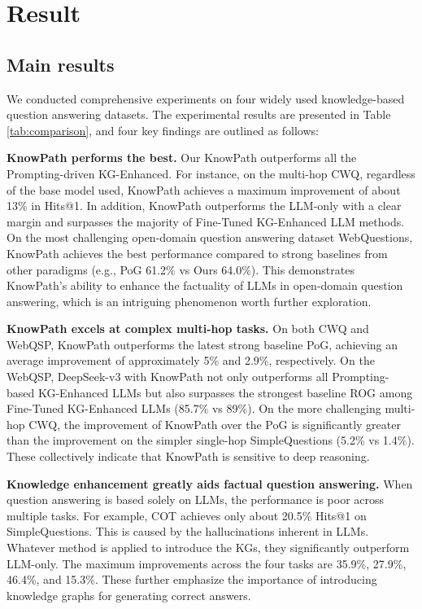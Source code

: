 \section{Result}

\subsection{Main results}

We conducted comprehensive experiments on four widely used knowledge-based question answering datasets. The experimental results are presented in Table \ref{tab:comparison}, and four key findings are outlined as follows:


\textbf{KnowPath performs the best.}
Our KnowPath outperforms all the Prompting-driven KG-Enhanced.
For instance, on the multi-hop CWQ, regardless of the base model used, KnowPath achieves a maximum improvement of about 13\% in Hits@1.
In addition, KnowPath outperforms the LLM-only with a clear margin and surpasses the majority of Fine-Tuned KG-Enhanced LLM methods.
On the most challenging open-domain question answering dataset WebQuestions, KnowPath achieves the best performance compared to strong baselines from other paradigms (e.g., PoG 61.2\% vs Ours 64.0\%). This demonstrates KnowPath's ability to enhance the factuality of LLMs in open-domain question answering, which is an intriguing phenomenon worth further exploration.


\textbf{KnowPath excels at complex multi-hop tasks.}
On both CWQ and WebQSP, KnowPath outperforms the latest strong baseline PoG, achieving an average improvement of approximately 5\% and 2.9\%, respectively.
On the WebQSP, DeepSeek-v3 with KnowPath not only outperforms all Prompting-based KG-Enhanced LLMs but also surpasses the strongest baseline ROG among Fine-Tuned KG-Enhanced LLMs (85.7\% vs 89\%). 
On the more challenging multi-hop CWQ, the improvement of KnowPath over the PoG is significantly greater than the improvement on the simpler single-hop SimpleQuestions (5.2\% vs 1.4\%).
These collectively indicate that KnowPath is sensitive to deep reasoning.


\textbf{Knowledge enhancement greatly aids factual question answering.}
When question answering is based solely on LLMs, the performance is poor across multiple tasks. For example, COT achieves only about 20.5\% Hits@1 on SimpleQuestions.
This is caused by the hallucinations inherent in LLMs.
Whatever method is applied to introduce the KGs, they significantly outperform LLM-only. 
The maximum improvements across the four tasks are 35.9\%, 27.9\%, 46.4\%, and 15.3\%. 
These further emphasize the importance of introducing knowledge graphs for generating correct answers.



